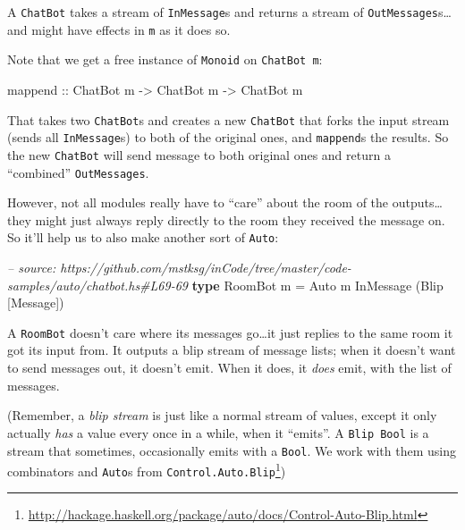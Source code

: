\documentclass[]{article}
\newenvironment{Shaded}{\begin{snugshade}}{\end{snugshade}}
\newcommand{\CommentTok}[1]{\textcolor[rgb]{0.56,0.35,0.01}{\textit{#1}}}
\newcommand{\DataTypeTok}[1]{\textcolor[rgb]{0.13,0.29,0.53}{#1}}
\newcommand{\FunctionTok}[1]{\textcolor[rgb]{0.00,0.00,0.00}{#1}}
\newcommand{\KeywordTok}[1]{\textcolor[rgb]{0.13,0.29,0.53}{\textbf{#1}}}
\newcommand{\NormalTok}[1]{#1}
\newcommand{\OtherTok}[1]{\textcolor[rgb]{0.56,0.35,0.01}{#1}}
\renewcommand{\href}[2]{#2\footnote{\url{#1}}}
\begin{document}
A \texttt{ChatBot} takes a stream of \texttt{InMessage}s and returns a stream of
\texttt{OutMessages}s\ldots{}and might have effects in \texttt{m} as it does so.

Note that we get a free instance of \texttt{Monoid} on \texttt{ChatBot\ m}:

\begin{Shaded}
\begin{Highlighting}[]
\NormalTok{mappend}\OtherTok{ ::} \DataTypeTok{ChatBot}\NormalTok{ m }\OtherTok{->} \DataTypeTok{ChatBot}\NormalTok{ m }\OtherTok{->} \DataTypeTok{ChatBot}\NormalTok{ m}
\end{Highlighting}
\end{Shaded}

That takes two \texttt{ChatBot}s and creates a new \texttt{ChatBot} that forks
the input stream (sends all \texttt{InMessage}s) to both of the original ones,
and \texttt{mappend}s the results. So the new \texttt{ChatBot} will send message
to both original ones and return a ``combined'' \texttt{OutMessages}.

However, not all modules really have to ``care'' about the room of the
outputs\ldots{}they might just always reply directly to the room they received
the message on. So it'll help us to also make another sort of \texttt{Auto}:

\begin{Shaded}
\begin{Highlighting}[]
\CommentTok{-- source: https://github.com/mstksg/inCode/tree/master/code-samples/auto/chatbot.hs#L69-69}
\KeywordTok{type} \DataTypeTok{RoomBot}\NormalTok{ m }\FunctionTok{=} \DataTypeTok{Auto}\NormalTok{ m }\DataTypeTok{InMessage}\NormalTok{ (}\DataTypeTok{Blip}\NormalTok{ [}\DataTypeTok{Message}\NormalTok{])}
\end{Highlighting}
\end{Shaded}

A \texttt{RoomBot} doesn't care where its messages go\ldots{}it just replies to
the same room it got its input from. It outputs a blip stream of message lists;
when it doesn't want to send messages out, it doesn't emit. When it does, it
\emph{does} emit, with the list of messages.

(Remember, a \emph{blip stream} is just like a normal stream of values, except
it only actually \emph{has} a value every once in a while, when it ``emits''. A
\texttt{Blip\ Bool} is a stream that sometimes, occasionally emits with a
\texttt{Bool}. We work with them using combinators and \texttt{Auto}s from
\href{http://hackage.haskell.org/package/auto/docs/Control-Auto-Blip.html}{\texttt{Control.Auto.Blip}})
\end{document}
